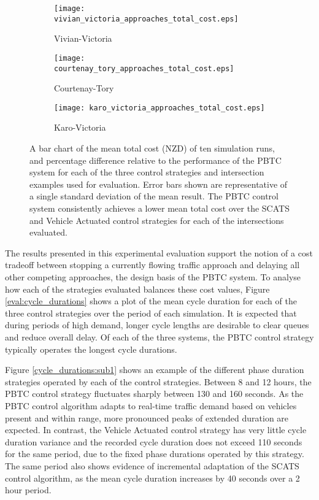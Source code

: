 \begin{figure}
\centering
\begin{subfigure}{.5\textwidth}
  \centering
  \texttt{[image: vivian\_victoria\_approaches\_total\_cost.eps]}
  \caption{Vivian-Victoria}
  \label{total_cost:sub1}
\end{subfigure}%
\begin{subfigure}{.5\textwidth}
  \centering
  \texttt{[image: courtenay\_tory\_approaches\_total\_cost.eps]}
  \caption{Courtenay-Tory}
  \label{total_cost:sub2}
\end{subfigure}

\vspace{1cm}

\begin{subfigure}{.5\textwidth}
  \centering
  \texttt{[image: karo\_victoria\_approaches\_total\_cost.eps]}
  \caption{Karo-Victoria}
  \label{total_cost:sub3}
\end{subfigure}%
\caption[Results of measuring the overall costs incurred each evaluation control strategy and intersection.]{A bar chart of the mean total cost (NZD) of ten simulation runs, and percentage difference relative to the performance of the PBTC system for each of the three control strategies and intersection examples used for evaluation. Error bars shown are representative of a single standard deviation of the mean result. The PBTC control system consistently achieves a lower mean total cost over the SCATS and Vehicle Actuated control strategies for each of the intersections evaluated. }
\label{eval:total_cost}
\end{figure}

The results presented in this experimental evaluation support the notion of a cost tradeoff between stopping a currently flowing traffic approach and delaying all other competing approaches, the design basis of the PBTC system. To analyse how each of the strategies evaluated balances these cost values, Figure \ref{eval:cycle_durations} shows a plot of the mean cycle duration for each of the three control strategies over the period of each simulation. It is expected that during periods of high demand, longer cycle lengths are desirable to clear queues and reduce overall delay. Of each of the three systems, the PBTC control strategy typically operates the longest cycle durations.

Figure \ref{cycle_durations:sub1} shows an example of the different phase duration strategies operated by each of the control strategies. Between 8 and 12 hours, the PBTC control strategy fluctuates sharply between 130 and 160 seconds. As the PBTC control algorithm adapts to real-time traffic demand based on vehicles present and within range, more pronounced peaks of extended duration are expected. In contrast, the Vehicle Actuated control strategy has very little cycle duration variance and the recorded cycle duration does not exceed 110 seconds for the same period, due to the fixed phase durations operated by this strategy. The same period also shows evidence of incremental adaptation of the SCATS control algorithm, as the mean cycle duration increases by 40 seconds over a 2 hour period. 

